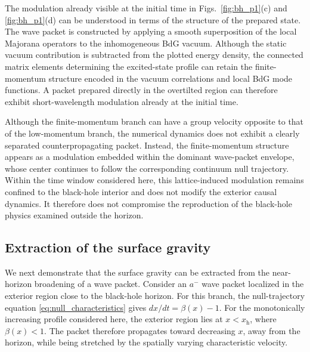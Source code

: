 \documentclass[reprint,amsmath,amssymb,aps,prb,showkeys,superscriptaddress]{revtex4-2}
\begin{document}
The modulation already visible at the initial time in
Figs.~\ref{fig:bh_p1}(c) and \ref{fig:bh_p1}(d) can be understood
in terms of the structure of the prepared state. The wave packet is
constructed by applying a smooth superposition of the local
Majorana operators to the inhomogeneous BdG vacuum. Although the
static vacuum contribution is subtracted from the plotted energy
density, the connected matrix elements determining the
excited-state profile can retain the finite-momentum structure
encoded in the vacuum correlations and local BdG mode functions.
A packet prepared directly in the overtilted region can therefore
exhibit short-wavelength modulation already at the initial time.

Although the finite-momentum branch can have a group velocity
opposite to that of the low-momentum branch, the numerical dynamics
does not exhibit a clearly separated counterpropagating packet.
Instead, the finite-momentum structure appears as a modulation
embedded within the dominant wave-packet envelope, whose center
continues to follow the corresponding continuum null trajectory.
Within the time window considered here, this lattice-induced
modulation remains confined to the black-hole interior and does not
modify the exterior causal dynamics. It therefore does not
compromise the reproduction of the black-hole physics examined
outside the horizon.

\subsection{Extraction of the surface gravity}
\label{subsec:surface_gravity}

We next demonstrate that the surface gravity can be extracted from
the near-horizon broadening of a wave packet. Consider an $a^-$
wave packet localized in the exterior region close to the
black-hole horizon. For this branch, the null-trajectory equation
\eqref{eq:null_characteristics} gives
$dx/dt=\beta(x)-1$. For the monotonically increasing profile
considered here, the exterior region lies at $x<x_{\mathrm h}$,
where $\beta(x)<1$. The packet therefore propagates toward
decreasing $x$, away from the horizon, while being stretched by the
spatially varying characteristic velocity.
\end{document}
